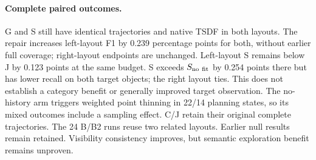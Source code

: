 \paragraph{Complete paired outcomes.}
G and S still have identical trajectories and native TSDF in both layouts. The repair increases left-layout F1 by 0.239 percentage points for both, without earlier full coverage; right-layout endpoints are unchanged. Left-layout S remains below J by 0.123 points at the same budget. S exceeds $S_{\rm no\ fit}$ by 0.254 points there but has lower recall on both target objects; the right layout ties. This does not establish a category benefit or generally improved target observation. The no-history arm triggers weighted point thinning in 22/14 planning states, so its mixed outcomes include a sampling effect. C/J retain their original complete trajectories. The 24 B/B2 runs reuse two related layouts. Earlier null results remain retained. Visibility consistency improves, but semantic exploration benefit remains unproven.
